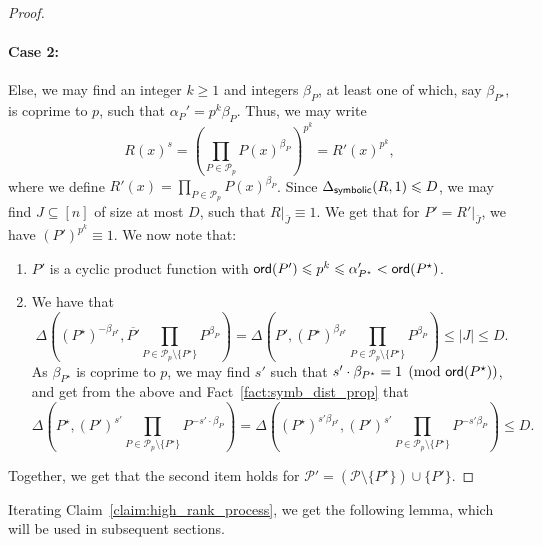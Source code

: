 \documentclass[10pt,a4paper]{amsart}
\newcommand\card[1]{\left| {#1} \right|}
\renewcommand\geq{\geqslant}
\renewcommand\leq{\leqslant}
\begin{document}
\begin{proof}
        \paragraph{Case 2:} Else, we may find an integer $k\geq 1$ and integers  $\beta_P$, at least one of which, say $\beta_{P^{\star}}$, is coprime to $p$, such that $\alpha_P' = p^k \beta_P$. Thus, we may write
        \[
        R(x)^{s} 
        = \left(\prod\limits_{P\in \mathcal{P}_p}P(x)^{\beta_P}\right)^{p^k} = 
        R'(x)^{p^k},
        \]
        where we define $R'(x)=\prod\limits_{P\in \mathcal{P}_p}P(x)^{\beta_P}$. Since $\Delta_{{\sf symbolic}}(R,1)\leq D$, we may find $J\subseteq [n]$ of size at most $D$, such that $R|_{\bar{J}}\equiv 1$. We get that for $P' = R'|_{\bar{J}}$, we have $(P')^{p^{k}}\equiv 1$. We now note that:
        \begin{enumerate}
        \item $P'$ is a cyclic product function with ${\sf ord}(P') \leq p^{k}\leq \alpha_{P^{\star}}' < {\sf ord}(P^{\star})$.
        \item We have that
        \[
            \Delta\left((P^{\star})^{-\beta_{P^{\star}}},
            \overline{P'}\prod\limits_{P\in\mathcal{P}_{p}\setminus\{P^{\star}\}} P^{\beta_P}\right)
            =
            \Delta\left(P', (P^{\star})^{\beta_{P^{\star}}}
            \prod\limits_{P\in\mathcal{P}_{p}\setminus\{P^{\star}\}} P^{\beta_P}\right)
            \leq \card{J}\leq D.
        \]
        As $\beta_{P^{\star}}$ is coprime to $p$, we may find $s'$ such that $s'\cdot \beta_{P^{\star}}=1\pmod{{\sf ord}(P^{\star})}$, and get from the above and Fact~\ref{fact:symb_dist_prop} that
        \[
        \Delta
        \left(P^{\star},
            (P')^{s'}\prod\limits_{P\in\mathcal{P}_{p}\setminus\{P^{\star}\}} P^{-s'\cdot\beta_P}\right)
            =
            \Delta\left((P^{\star})^{s'\beta_{P^{\star}}},(P')^{s'}\prod\limits_{P\in\mathcal{P}_{p}\setminus\{P^{\star}\}} P^{-s'\beta_P}\right)
            \leq D.
        \]
        \end{enumerate}
        Together, we get that the second item holds for $\mathcal{P}'=
        (\mathcal{P}\setminus\{P^{\star}\})\cup\{P'\}$.
    \end{proof}
    Iterating Claim~\ref{claim:high_rank_process}, we get the following lemma, which will be used in subsequent sections.
\end{document}
